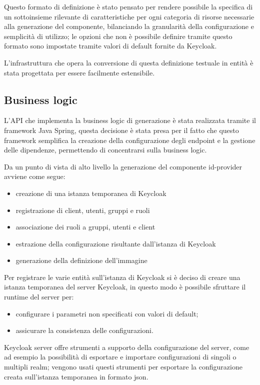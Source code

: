 Questo formato di definizione è stato pensato per rendere possibile la specifica di un sottoinsieme rilevante di caratteristiche per ogni categoria di risorse necessarie alla generazione del componente, bilanciando la granularità della configurazione e semplicità di utilizzo; le opzioni che non è possibile definire tramite questo formato sono impostate tramite valori di default fornite da Keycloak.

L'infrastruttura che opera la conversione di questa definizione testuale in entità è stata progettata per essere facilmente estensibile.

\subsection{Business logic}

L'API che implementa la business logic di generazione è stata realizzata tramite il framework Java Spring, questa decisione è stata presa per il fatto che questo framework semplifica la creazione della configurazione degli endpoint e la gestione delle dipendenze, permettendo di concentrarsi sulla business logic.

Da un punto di vista di alto livello la generazione del componente id-provider avviene come segue:
\begin{itemize}
    \item creazione di una istanza temporanea di Keycloak
    \item registrazione di client, utenti, gruppi e ruoli
    \item associazione dei ruoli a gruppi, utenti e client
    \item estrazione della configurazione risultante dall'istanza di Keycloak
    \item generazione della definizione dell'immagine
\end{itemize}

Per registrare le varie entità sull'istanza di Keycloak si è deciso di creare una istanza temporanea del server Keycloak, in questo modo è possibile sfruttare il runtime del server per: 
\begin{itemize}
    \item configurare i parametri non specificati con valori di default;
    \item assicurare la consistenza delle configurazioni.
\end{itemize}

Keycloak server offre strumenti a supporto della configurazione del server, come ad esempio la possibilità di esportare e importare configurazioni di singoli o multipli realm; vengono usati questi strumenti per esportare la configurazione creata sull'istanza temporanea in formato json.

